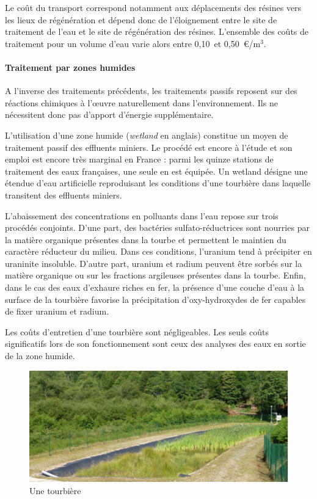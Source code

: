 \documentclass{article}
\begin{document}
Le coût du transport correspond notamment aux déplacements des résines vers les lieux de régénération et dépend donc de l’éloignement entre le site de traitement de l’eau et le site de régénération des résines.
L’ensemble des coûts de traitement pour un volume d’eau varie alors entre 0,10~et 0,50~\euro{}/$\text{m}^3$.

\paragraph{Traitement par zones humides}

A l’inverse des traitements précédents, les traitements passifs reposent sur des réactions chimiques à l’œuvre naturellement dans l’environnement. Ils ne nécessitent donc pas d’apport d’énergie supplémentaire. 

L’utilisation d’une zone humide (\textit{wetland} en anglais) constitue un moyen de traitement passif des effluents miniers. Le procédé est encore à l’étude et son emploi est encore très marginal en France : parmi les quinze stations de traitement des eaux françaises, une seule en est équipée. Un wetland désigne une étendue d’eau artificielle reproduisant les conditions d’une tourbière dans laquelle transitent des effluents miniers. 

L’abaissement des concentrations en polluants dans l’eau repose sur trois procédés conjoints. D’une part, des bactéries sulfato-réductrices sont nourries par la matière organique présentes dans la tourbe et permettent le maintien du caractère réducteur du milieu. Dans ces conditions, l’uranium tend à précipiter en uraninite insoluble. D’autre part, uranium et radium peuvent être sorbés sur la matière organique ou sur les fractions argileuses présentes dans la tourbe. Enfin, dans le cas des eaux d’exhaure riches en fer, la présence d’une couche d’eau à la surface de la tourbière favorise la précipitation d’oxy-hydroxydes de fer capables de fixer uranium et radium. 

Les coûts d’entretien d’une tourbière sont négligeables. Les seuls coûts significatifs lors de son fonctionnement sont ceux des analyses des eaux en sortie de la zone humide.

\begin{figure}[H]
\centering
\includegraphics[width=0.7\linewidth]{III_A_4.png}
\caption{Une tourbière}
\label{fig:tourbiere}
\end{figure}
\end{document}
